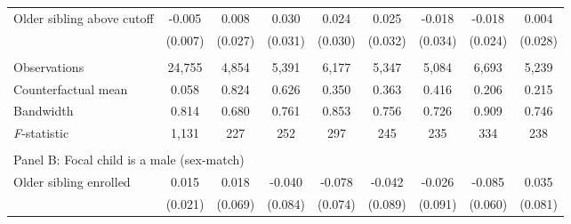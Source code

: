 \begin{table}[!htbp]
{{\begin{tabular}{lcccccccc}
Older sibling above cutoff&      -0.005   &       0.008   &       0.030   &       0.024   &       0.025   &      -0.018   &      -0.018   &       0.004   \\
                    &     (0.007)   &     (0.027)   &     (0.031)   &     (0.030)   &     (0.032)   &     (0.034)   &     (0.024)   &     (0.028)   \\
                    &               &               &               &               &               &               &               &               \\
Observations        &      24,755   &       4,854   &       5,391   &       6,177   &       5,347   &       5,084   &       6,693   &       5,239   \\
Counterfactual mean &       0.058   &       0.824   &       0.626   &       0.350   &       0.363   &       0.416   &       0.206   &       0.215   \\
Bandwidth           &       0.814   &       0.680   &       0.761   &       0.853   &       0.756   &       0.726   &       0.909   &       0.746   \\
\textit{F}-statistic&       1,131   &         227   &         252   &         297   &         245   &         235   &         334   &         238   \\
 
&  &  &  & & & & & \\
\multicolumn{10}{l}{Panel B: Focal child is a male (sex-match)} \\
Older sibling enrolled&       0.015   &       0.018   &      -0.040   &      -0.078   &      -0.042   &      -0.026   &      -0.085   &       0.035   \\
                    &     (0.021)   &     (0.069)   &     (0.084)   &     (0.074)   &     (0.089)   &     (0.091)   &     (0.060)   &     (0.081)   \\
 

\end{tabular}}}
\end{table}
